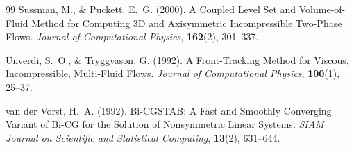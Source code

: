 \documentclass[12pt, a4paper, titlepage]{article}
\begin{document}
\begin{thebibliography}{99}
Sussman, M., \& Puckett, E.~G. (2000).
A Coupled Level Set and Volume-of-Fluid Method for Computing 3D and Axisymmetric Incompressible Two-Phase Flows.
\textit{Journal of Computational Physics}, \textbf{162}(2), 301--337.

Unverdi, S.~O., \& Tryggvason, G. (1992).
A Front-Tracking Method for Viscous, Incompressible, Multi-Fluid Flows.
\textit{Journal of Computational Physics}, \textbf{100}(1), 25--37.

van der Vorst, H.~A. (1992).
Bi-CGSTAB: A Fast and Smoothly Converging Variant of Bi-CG for the Solution of
Nonsymmetric Linear Systems.
\textit{SIAM Journal on Scientific and Statistical Computing}, \textbf{13}(2), 631--644.

\end{thebibliography}
\end{document}
